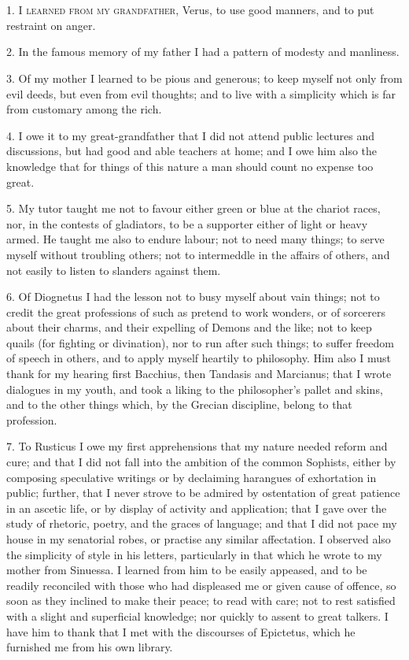 \documentclass{book}
\begin{document}
\mainmatter

\chapter[I learned from my grandfather...]{}

1. \textsc{I learned from my grandfather,} Verus, to use good manners,
and to put restraint on anger.

2. In the famous memory of my father I had a pattern of modesty and
manliness.

3. Of my mother I learned to be pious and generous; to keep myself not
only from evil deeds, but even from evil thoughts; and to live with a
simplicity which is far from customary among the rich.

4. I owe it to my great-grandfather that I did not attend public
lectures and discussions, but had good and able teachers at home; and I
owe him also the knowledge that for things of this nature a man should
count no expense too great.

5. My tutor taught me not to favour either green or blue at the
chariot races, nor, in the contests of gladiators, to be a supporter
either of light or heavy armed. He taught me also to endure labour;
not to need many things; to serve myself without troubling others; not
to intermeddle in the affairs of others, and not easily to listen to
slanders against them.

\newpage

6. Of Diognetus I had the lesson not to busy myself about vain things;
not to credit the great professions of such as pretend to work
wonders, or of sorcerers about their charms, and their expelling of
Demons and the like; not to keep quails (for fighting or divination),
nor to run after such things; to suffer freedom of speech in others,
and to apply myself heartily to philosophy. Him also I must thank for
my hearing first Bacchius, then Tandasis and Marcianus; that I wrote
dialogues in my youth, and took a liking to the philosopher's pallet
and skins, and to the other things which, by the Grecian discipline,
belong to that profession.

7. To Rusticus I owe my first apprehensions that my nature needed
reform and cure; and that I did not fall into the ambition of the
common Sophists, either by composing speculative writings or by
declaiming harangues of exhortation in public; further, that I never
strove to be admired by ostentation of great patience in an ascetic
life, or by display of activity and application; that I gave over the
study of rhetoric, poetry, and the graces of language; and that I did
not pace my house in my senatorial robes, or practise any similar
affectation. I observed also the simplicity of style in his letters,
particularly in that which he wrote to my mother from Sinuessa. I
learned from him to be easily appeased, and to be readily reconciled
with those who had displeased me or given cause of offence, so soon as
they inclined to make their peace; to read with care; not to rest
satisfied with a slight and superficial knowledge; nor quickly to
assent to great talkers. I have him to thank that I met with the
discourses of Epictetus, which he furnished me from his own library.
\end{document}

